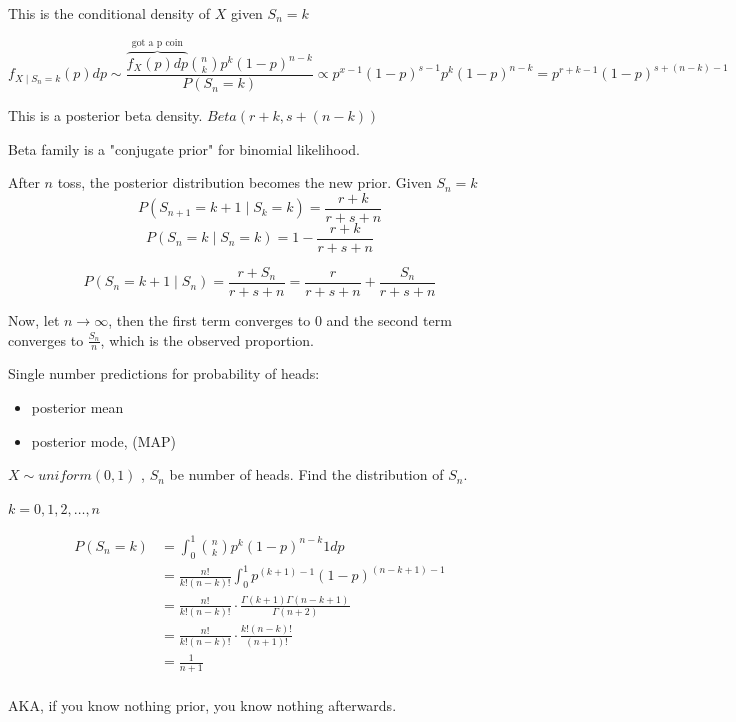 \documentclass{report}
\begin{document}
This is the conditional density of $ X$ given $ S_{n} = k $ 


\[
	f_{X \mid S_{n} = k} (p)dp  \sim \frac{\overbrace{f_{X}(p)dp}^{\text{got a p coin}} \binom{n}{k}p^{k}(1-p)^{n-k} }{P(S_{n}= k)} \propto p^{x-1}(1-p)^{s-1} p^{k}(1-p)^{n-k} = p^{r+k-1} (1-p)^{s + (n-k)  - 1}
\]

This is a posterior beta density. $ Beta(r+k, s+(n-k)) $ 


Beta family is a "conjugate prior" for binomial likelihood.  

After $ n $  toss, the posterior distribution becomes the new prior. Given $ S_{n} = k $ 
\[
P(S_{n+1} = k+1 \mid S_{k} = k) = \frac{r+k}{r + s + n}
\]
\[
P(S_{n} = k \mid S_{n} = k) = 1 - \frac{r+k}{r+s+n}
\]


\[
P(S_{n} = k+1 \mid S_{n})  = \frac{r+S_{n}}{r+s + n} = \frac{r}{r+s+n} + \frac{S_{n}}{r+s+n}
\]

Now, let $ n \to \infty  $, then the first term converges to 0 and the second term converges to $ \frac{S_{n}}{n} $, which is the observed proportion. 


Single number predictions for probability of heads: 
\begin{itemize}
	\item posterior mean
	\item posterior mode, (MAP) 
\end{itemize}



$ X \sim  uniform(0,1) $ , $ S_{n} $ be number of heads. Find the distribution of $ S_{n} $. 

$ k=0,1,2,\dots, n $ 


\begin{align*}
	P(S_{n} = k) &= \int_{0}^{1}\binom{n}{k} p^{k}(1-p)^{n-k} 1 dp \\
	&= \frac{n!}{k!(n-k)!} \int_{0}^{1}p^{(k+1) -1} (1-p)^{(n-k+1) - 1} \\
	&= \frac{n!}{k!(n-k)!} \cdot \frac{\Gamma(k+1)\Gamma(n-k+1)}{\Gamma(n+2)} \\
	&= \frac{n!}{k!(n-k)!} \cdot \frac{k! (n-k)!}{(n+1)!} \\
	&= \frac{1}{n+1} \\
\end{align*}

AKA, if you know nothing prior, you know nothing afterwards.


\chapter{}
\end{document}
